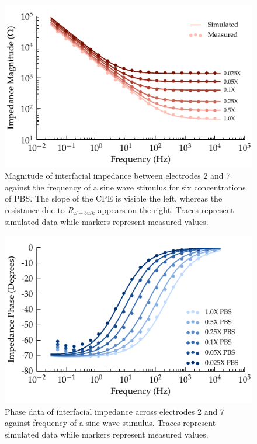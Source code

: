 \documentclass[journal, a4paper]{IEEEtran}
\begin{document}
\begin{figure}
    \begin{center}
        \includegraphics{graphics/displacement_impedanceVsFrequency_magnitude}
    \end{center}
    \caption{Magnitude of interfacial impedance between electrodes 2 and 7 against the frequency of a sine wave stimulus for six concentrations of PBS. The slope of the CPE is visible the left, whereas the resistance due to $R_{S+bulk}$ appears on the right. Traces represent simulated data while markers represent measured values.}
    \label{fig:CPE_Magnitude}
\end{figure}

\begin{figure}
    \begin{center}
        \includegraphics{graphics/displacement_impedanceVsFrequency_phase}
    \end{center}
    \caption{Phase data of interfacial impedance across electrodes 2 and 7 against frequency of a sine wave stimulus. Traces represent simulated data while markers represent measured values.}
    \label{fig:CPE_Phase}
\end{figure}
\end{document}
